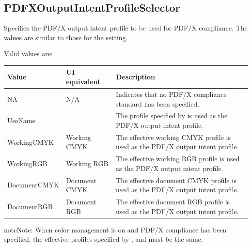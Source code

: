 \documentclass[letterpaper,12pt,english,openany,oneside]{sphinxmanual}
\begin{document}
\subsection{PDFXOutputIntentProfileSelector}
\label{\detokenize{PDF_Create_NewNamespaces:pdfxoutputintentprofileselector}}
Specifies the PDF/X output intent profile to be used for PDF/X compliance. The values are similar to those for the  setting.

Valid values are:


\begin{savenotes}\sphinxattablestart
\centering
{}\label{\detokenize{PDF_Create_NewNamespaces:section-3}}\nobreak
\begin{tabulary}{\linewidth}[t]{|T|T|T|}
\hline
\sphinxstyletheadfamily 
Value
&\sphinxstyletheadfamily 
UI equivalent
&\sphinxstyletheadfamily 
Description
\\
\hline
NA
&
N/A
&
Indicates that no PDF/X compliance standard has been specified.
\\
\hline
UseName
&
&
The profile specified by  is used as the PDF/X output intent profile.
\\
\hline
WorkingCMYK
&
Working CMYK
&
The effective working CMYK profile is used as the PDF/X output intent profile.
\\
\hline
WorkingRGB
&
Working RGB
&
The effective working RGB profile is used as the PDF/X output intent profile.
\\
\hline
DocumentCMYK
&
Document CMYK
&
The effective document CMYK profile is used as the PDF/X output intent profile.
\\
\hline
DocumentRGB
&
Document RGB
&
The effective document RGB profile is used as the PDF/X output intent profile.
\\
\hline
\end{tabulary}
\par
\sphinxattableend\end{savenotes}

\begin{sphinxadmonition}{note}{Note:}
When color management is on and PDF/X compliance has been specified, the effective profiles specified by  ,  and  must be the same.
\end{sphinxadmonition}
\end{document}
